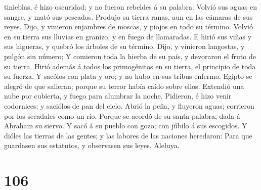 tinieblas, é hizo oscuridad; y no fueron rebeldes á su palabra.
 Volvió sus aguas en sangre, y mató sus pescados.
 Produjo su tierra ranas, aun en las cámaras de sus
reyes.  Dijo, y vinieron enjambres de moscas, y piojos en
todo su término.  Volvió en su tierra sus lluvias en
granizo, y en fuego de llamaradas.  E hirió sus viñas y
sus higueras, y quebró los árboles de su término.  Dijo,
y vinieron langostas, y pulgón sin número;  Y comieron
toda la hierba de su país, y devoraron el fruto de su tierra.
 Hirió además á todos los primogénitos en su tierra, el
principio de toda su fuerza.  Y sacólos con plata y oro;
y no hubo en sus tribus enfermo.  Egipto se alegró de que
salieran; porque su terror había caído sobre ellos. 
Extendió una nube por cubierta, y fuego para alumbrar la noche.
 Pidieron, é hizo venir codornices; y saciólos de pan del
cielo.  Abrió la peña, y fluyeron aguas; corrieron por
los secadales como un río.  Porque se acordó de su santa
palabra, dada á Abraham su siervo.  Y sacó á su pueblo
con gozo; con júbilo á sus escogidos.  Y dióles las
tierras de las gentes; y las labores de las naciones heredaron:
 Para que guardasen sus estatutos, y observasen sus
leyes. Aleluya.

\hypertarget{section-105}{%
\section{106}\label{section-105}}

